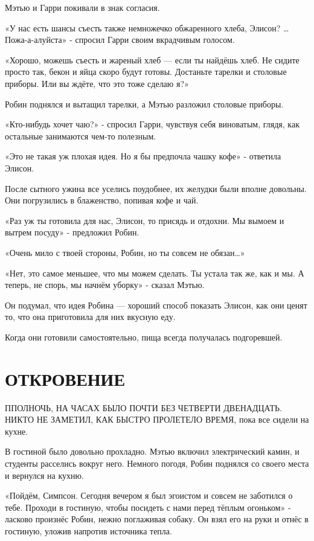 \documentclass[a5paper, 9pt,
final, openany, twoside=true]{memoir}
\begin{document}
Мэтью и Гарри покивали в знак согласия.

«У нас есть шансы съесть также немножечко обжаренного хлеба, Элисон? … Пожа-а-алуйста» - спросил Гарри своим вкрадчивым голосом.

«Хорошо, можешь съесть и жареный хлеб — если ты найдёшь хлеб. Не сидите просто так, бекон и яйца скоро будут готовы. Достаньте тарелки и столовые приборы. Или вы ждёте, что это тоже сделаю я?»

Робин поднялся и вытащил тарелки, а Мэтью разложил столовые приборы.

«Кто-нибудь хочет чаю?» - спросил Гарри, чувствуя себя виноватым, глядя, как остальные занимаются чем-то полезным.

«Это не такая уж плохая идея. Но я бы предпочла чашку кофе» - ответила Элисон.

После сытного ужина все уселись поудобнее, их желудки были вполне довольны. Они погрузились в блаженство, попивая кофе и чай.

«Раз уж ты готовила для нас, Элисон, то присядь и отдохни. Мы вымоем и вытрем посуду» - предложил Робин.

«Очень мило с твоей стороны, Робин, но ты совсем не обязан…»

«Нет, это самое меньшее, что мы можем сделать. Ты устала так же, как и мы. А теперь, не спорь, мы начнём уборку» - сказал Мэтью.

Он подумал, что идея Робина — хороший способ показать Элисон, как они ценят то, что она приготовила для них вкусную еду.

Когда они готовили самостоятельно, пища всегда получалась подгоревшей.
\chapter{ОТКРОВЕНИЕ}
П{ ПОЛНОЧЬ, НА ЧАСАХ БЫЛО ПОЧТИ БЕЗ ЧЕТВЕРТИ ДВЕНАДЦАТЬ. НИКТО НЕ ЗАМЕТИЛ, КАК БЫСТРО ПРОЛЕТЕЛО ВРЕМЯ}, пока все сидели на кухне.\bigskip

В гостиной было довольно прохладно. Мэтью включил электрический камин, и студенты расселись вокруг него. Немного погодя, Робин поднялся со своего места и вернулся на кухню.

«Пойдём, Симпсон. Сегодня вечером я был эгоистом и совсем не заботился о тебе. Проходи в гостиную, чтобы посидеть с нами перед тёплым огоньком» - ласково произнёс Робин, нежно поглаживая собаку. Он взял его на руки и отнёс в гостиную, уложив напротив источника тепла.\bigskip
\end{document}

